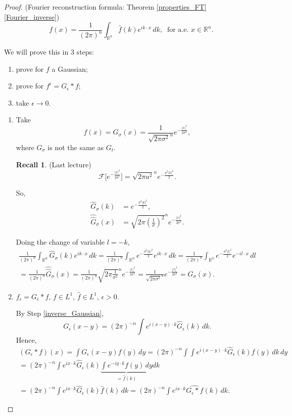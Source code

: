\documentclass[12pt]{article}
\theoremstyle{definition}
\newtheorem*{recall}{Recall}
\begin{document}
\begin{proof}
(Fourier reconstruction formula: Theorem \ref{properties_FT} \eqref{Fourier_inverse})
\begin{equation}\tag{R}
f(x)=\frac1{(2\pi)^n}\int_{\mathbb R^n}\hat f(k)e^{ik\cdot x}\,dk,\ \text{ for a.e. }x\in\mathbb R^n.
\end{equation}

We will prove this in 3 steps:
\begin{enumerate}[label=(\arabic*)]
\item prove for $f$ a Gaussian;
\item prove for $f^\epsilon=G_\epsilon*f$;
\item take $\epsilon\to0$.
\end{enumerate}

\begin{enumerate}[label=\arabic*.]
\item\label{inverse_Gaussian} Take
\[f(x)=G_\sigma(x)=\frac1{\sqrt{2\pi\sigma^2}^n}e^{-\frac{|x|^2}{2\sigma^2}},\]
where $G_\sigma$ is not the same as $G_t$.

\begin{recall}
(Last lecture)
\[\mathcal F\Big[e^{-\frac{|x|^2}{2a^2}}\Big]=\sqrt{2\pi a^2}^ne^{-\frac{a^2|k|^2}2}.\]
\end{recall}
So,
\begin{align*}
\widehat G_\sigma(k)&=e^{-\frac{\sigma^2|k|^2}2},\\
\widehat{\widehat G}_\sigma(x)&=\sqrt{2\pi\left(\frac1\sigma\right)^2}^ne^{-\frac{|x|^2}{2\sigma^2}}.
\end{align*}

Doing the change of variable $l=-k$,
\begin{multline*}
\frac1{(2\pi)^n}\int_{\mathbb R^n}\widehat G_\sigma(k)e^{ik\cdot x}\,dk=\frac1{(2\pi)^n}\int_{\mathbb R^n}e^{-\frac{\sigma^2|k|^2}2}e^{ik\cdot x}\,dk=\frac1{(2\pi)^n}\int_{\mathbb R^n}e^{-\frac{\sigma^2|l|^2}2}e^{-il\cdot x}\,dl\\
=\frac1{(2\pi)^n}\widehat{\widehat G}_\sigma(x)=\frac1{(2\pi)^n}\sqrt{2\pi\frac1{\sigma^2}}^ne^{-\frac{|x|^2}{2\sigma^2}}=\frac1{\sqrt{2\pi\sigma^2}^n}e^{-\frac{|x|^2}{2\sigma^2}}=G_\sigma(x).
\end{multline*}

\item\label{inverse_mollified} $f_\epsilon=G_\epsilon*f$, $f\in L^1$, $\hat f\in L^1$, $\epsilon>0$.

By Step \ref{inverse_Gaussian},
\[G_\epsilon(x-y)=(2\pi)^{-n}\int e^{i(x-y)\cdot k}\widehat G_\epsilon(k)\,dk.\]
Hence,
\begin{multline*}
(G_\epsilon*f)(x)=\int G_\epsilon(x-y)f(y)\,dy=(2\pi)^{-n}\int\int e^{i(x-y)\cdot k}\widehat G_\epsilon(k)f(y)\,dk\,dy\\
=(2\pi)^{-n}\int e^{ix\cdot k}\widehat G_\epsilon(k)\underbrace{\int e^{-iy\cdot k}f(y)\,dy}_{=\hat f(k)}dk\\
=(2\pi)^{-n}\int e^{ix\cdot k}\widehat G_\epsilon(k)\hat f(k)\,dk=(2\pi)^{-n}\int e^{ix\cdot k}\widehat{G_\epsilon*f}(k)\,dk.
\end{multline*}


\end{enumerate}
\end{proof}
\end{document}
